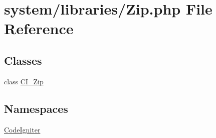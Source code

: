 \hypertarget{_zip_8php}{}\section{system/libraries/\+Zip.php File Reference}
\label{_zip_8php}
\subsection*{Classes}
\begin{DoxyCompactItemize}
\item 
class \mbox{\hyperlink{class_c_i___zip}{C\+I\+\_\+\+Zip}}
\end{DoxyCompactItemize}
\subsection*{Namespaces}
\begin{DoxyCompactItemize}
\item 
 \mbox{\hyperlink{namespace_code_igniter}{Code\+Igniter}}
\end{DoxyCompactItemize}
